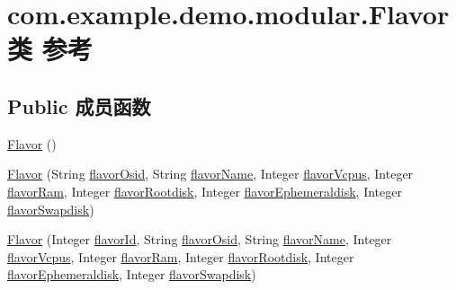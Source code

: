 \hypertarget{classcom_1_1example_1_1demo_1_1modular_1_1_flavor}{}\section{com.\+example.\+demo.\+modular.\+Flavor类 参考}
\label{classcom_1_1example_1_1demo_1_1modular_1_1_flavor}
\subsection*{Public 成员函数}
\begin{DoxyCompactItemize}
\item 
\mbox{\hyperlink{classcom_1_1example_1_1demo_1_1modular_1_1_flavor_aa330663cbc1725f463df5eae6d0c600b}{Flavor}} ()
\item 
\mbox{\hyperlink{classcom_1_1example_1_1demo_1_1modular_1_1_flavor_a5265399778d65914e47414ed95db150f}{Flavor}} (String \mbox{\hyperlink{classcom_1_1example_1_1demo_1_1modular_1_1_flavor_a7d9900a2a3fde061bb866a273cbee78a}{flavor\+Osid}}, String \mbox{\hyperlink{classcom_1_1example_1_1demo_1_1modular_1_1_flavor_aeec6be20b22e2c0de56ce89626a1b1c8}{flavor\+Name}}, Integer \mbox{\hyperlink{classcom_1_1example_1_1demo_1_1modular_1_1_flavor_a54e7ce2a17f9f8b5427d35ab59366734}{flavor\+Vcpus}}, Integer \mbox{\hyperlink{classcom_1_1example_1_1demo_1_1modular_1_1_flavor_ae6bc06cd7fe878a5d958edba57adfcc2}{flavor\+Ram}}, Integer \mbox{\hyperlink{classcom_1_1example_1_1demo_1_1modular_1_1_flavor_aeffb12398b331a1b9e426546a0bf60d5}{flavor\+Rootdisk}}, Integer \mbox{\hyperlink{classcom_1_1example_1_1demo_1_1modular_1_1_flavor_a344782ea913e47b1a2eadca2fa9dab22}{flavor\+Ephemeraldisk}}, Integer \mbox{\hyperlink{classcom_1_1example_1_1demo_1_1modular_1_1_flavor_aaf9949698de88871632616e0170c8aee}{flavor\+Swapdisk}})
\item 
\mbox{\hyperlink{classcom_1_1example_1_1demo_1_1modular_1_1_flavor_afd3f861db1b13ba9ebce2c55a0eddc05}{Flavor}} (Integer \mbox{\hyperlink{classcom_1_1example_1_1demo_1_1modular_1_1_flavor_aa6d327ab2dbe6e2fe8dbd67f467c30c7}{flavor\+Id}}, String \mbox{\hyperlink{classcom_1_1example_1_1demo_1_1modular_1_1_flavor_a7d9900a2a3fde061bb866a273cbee78a}{flavor\+Osid}}, String \mbox{\hyperlink{classcom_1_1example_1_1demo_1_1modular_1_1_flavor_aeec6be20b22e2c0de56ce89626a1b1c8}{flavor\+Name}}, Integer \mbox{\hyperlink{classcom_1_1example_1_1demo_1_1modular_1_1_flavor_a54e7ce2a17f9f8b5427d35ab59366734}{flavor\+Vcpus}}, Integer \mbox{\hyperlink{classcom_1_1example_1_1demo_1_1modular_1_1_flavor_ae6bc06cd7fe878a5d958edba57adfcc2}{flavor\+Ram}}, Integer \mbox{\hyperlink{classcom_1_1example_1_1demo_1_1modular_1_1_flavor_aeffb12398b331a1b9e426546a0bf60d5}{flavor\+Rootdisk}}, Integer \mbox{\hyperlink{classcom_1_1example_1_1demo_1_1modular_1_1_flavor_a344782ea913e47b1a2eadca2fa9dab22}{flavor\+Ephemeraldisk}}, Integer \mbox{\hyperlink{classcom_1_1example_1_1demo_1_1modular_1_1_flavor_aaf9949698de88871632616e0170c8aee}{flavor\+Swapdisk}})

\end{DoxyCompactItemize}
